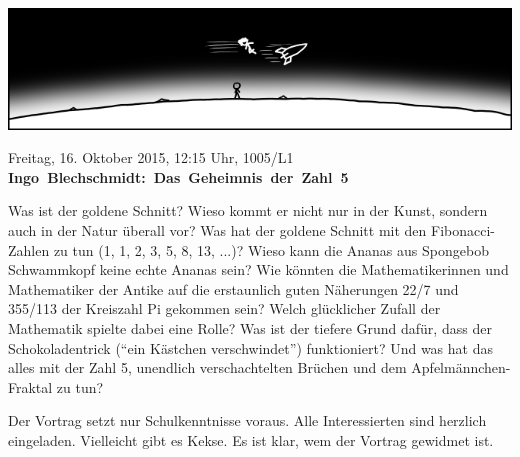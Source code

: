 \documentclass[a4paper,ngerman,landscape]{scrartcl}
\begin{document}
\begin{center}
  \Huge
  \vspace*{0.0em}
  \includegraphics[scale=1.00]{orbit-wide}
  \vspace{0.5em}

  \vspace{1em}

  Freitag, 16. Oktober 2015, 12:15 Uhr, 1005/L1 \\
  \mbox{\textbf{Ingo Blechschmidt: Das Geheimnis der Zahl 5}}

  \Large
  \begin{minipage}{0.80\textwidth}
    \setlength\parskip{\medskipamount}
    Was ist der goldene Schnitt? Wieso kommt er nicht nur in der Kunst, sondern
    auch in der Natur überall vor? Was hat der goldene Schnitt mit den
    Fibonacci-Zahlen zu tun (1, 1, 2, 3, 5, 8, 13, ...)? Wieso kann die Ananas
    aus Spongebob Schwammkopf keine echte Ananas sein? Wie könnten die
    Mathematikerinnen und Mathematiker der Antike auf die erstaunlich guten
    Näherungen 22/7 und 355/113 der Kreiszahl Pi gekommen sein? Welch
    glücklicher Zufall der Mathematik spielte dabei eine Rolle? Was ist der
    tiefere Grund dafür, dass der Schokoladentrick ("`ein Kästchen
    verschwindet"') funktioniert? Und was hat das alles mit der Zahl 5,
    unendlich verschachtelten Brüchen und dem Apfelmännchen-Fraktal zu tun?

    Der Vortrag setzt nur Schulkenntnisse voraus. Alle Interessierten sind
    herzlich eingeladen. Vielleicht gibt es Kekse. Es ist klar, wem der Vortrag
    gewidmet ist.
    \vspace{0.3em}
  \end{minipage}
\end{center}
\end{document}
